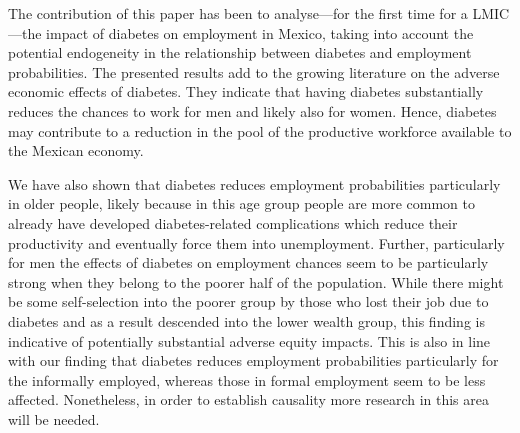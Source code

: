 The contribution of this paper has been to analyse---for
the first time for a \ac{LMIC}---the impact of diabetes on employment
in Mexico, taking into account the potential endogeneity in the relationship
between diabetes and employment probabilities. The presented results add
to the growing literature on the adverse economic effects of diabetes.
They indicate that having diabetes substantially reduces the chances
to work for men and likely also for women. Hence, diabetes may contribute
to a reduction in the pool of the productive workforce available to
the Mexican economy. 

We have also shown that diabetes reduces employment probabilities
particularly in older people, likely because in this age group people
are more common to already have developed diabetes-related complications
which reduce their productivity and eventually force them into unemployment.
Further, particularly for men the effects of diabetes on employment
chances seem to be particularly strong when they belong to the poorer
half of the population. While there might be some self-selection into
the poorer group by those who lost their job due to diabetes and as
a result descended into the lower wealth group, this finding is indicative
of potentially substantial adverse equity impacts. This is also in
line with our finding that diabetes reduces employment probabilities particularly
for the informally employed, whereas those in formal employment seem
to be less affected. Nonetheless, in order to establish causality
more research in this area will be needed. 

